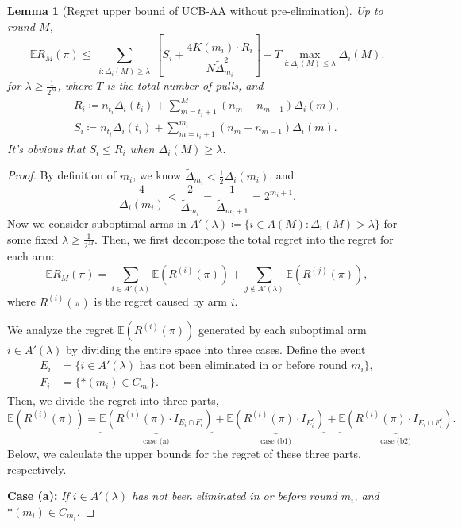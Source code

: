 \documentclass[
  12pt]{article}
\newtheorem{lemma}{Lemma}
\begin{document}
\begin{lemma}[Regret upper bound of UCB-AA without pre-elimination]
\label{UCB-A2 upper bound}
Up to round $M$, 
\[\mathbb{E}R_M(\pi)\leq \sum_{\substack{i: \Delta_i(M) \geq \lambda}} \left[ S_i +\frac{4K(m_i)\cdot R_i}{N\tilde{\Delta}_{m_i}^2}\right] + T\max_{i:\Delta_i(M)\leq \lambda}  \Delta_i(M).\]
for $\lambda\geq \frac{1}{2^M}$, where $T$ is the total number of pulls, and 
\begin{align*}
    R_i\coloneqq n_{t_i}\Delta_i(t_i)+\sum_{m=t_i+1}^M(n_m-n_{m-1})\Delta_i(m),\\
    S_i\coloneqq n_{t_i}\Delta_i(t_i)+\sum_{m=t_i+1}^{m_i}(n_m-n_{m-1})\Delta_i(m).
\end{align*}
It's obvious that $S_i\leq R_i$ when $\Delta_i(M) \geq \lambda$.
\end{lemma}
\begin{proof}
    By definition of $m_i$, we know $\tilde{\Delta}_{m_i}<\frac{1}{2}\Delta_i(m_i)$, and
    \[\frac{4}{\Delta_i(m_i)}<\frac{2}{\tilde{\Delta}_{m_i}}=\frac{1}{\tilde{\Delta}_{m_i+1}}=2^{m_i+1}.\]
Now we consider suboptimal arms in $A'(\lambda)\coloneqq\{i\in A(M):\Delta_i(M)>\lambda\}$ for some fixed $\lambda\geq \frac{1}{2^M}$. Then, we first decompose the total regret into the regret for each arm:
\[\mathbb{E}R_M(\pi)=\sum_{i\in A'(\lambda)}\mathbb{E}(R^{(i)}(\pi)) + \sum_{j\notin A'(\lambda)}\mathbb{E}(R^{(j)}(\pi)) ,\]
where $R^{(i)}(\pi)$ is the regret caused by arm $i$.

We analyze the regret $\mathbb{E}(R^{(i)}(\pi)) $ generated by each suboptimal arm $i\in A'(\lambda)$ by dividing the entire space into three cases. Define the event 
\begin{align*}
    E_i&=\{ i\in A'(\lambda) \text{ has not been eliminated in or before round } m_i  \}, \\
    F_i&=\{ *(m_i) \in C_{m_i} \}.
\end{align*}
Then, we divide the regret into three parts, 
\[\mathbb{E}(R^{(i)}(\pi)) = \underbrace{\mathbb{E}\left(R^{(i)}(\pi)\cdot I_{E_i\cap F_i}\right)}_{\text{case (a)}} + \underbrace{\mathbb{E}\left(R^{(i)}(\pi)\cdot I_{E_i^c}\right)}_{\text{case (b1)}} + \underbrace{\mathbb{E}\left(R^{(i)}(\pi)\cdot I_{E_i\cap F_i^c}\right)}_{\text{case (b2)}}.\]
Below, we calculate the upper bounds for the regret of these three parts, respectively.

\textbf{Case (a):} \textit{If \( i\in A'(\lambda) \) has not been eliminated in or before round \( m_i \), and \( *(m_i) \in C_{m_i} \).  }


\end{proof}
\end{document}
